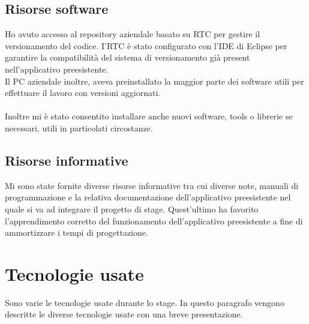 \subsection{Risorse software}
Ho avuto accesso al repository aziendale basato su RTC per gestire il versionamento del codice. I'RTC è stato configurato con l’IDE di Eclipse per garantire la compatibilità del sistema di versionamento già present nell'applicativo preesistente. \\
Il PC aziendale inoltre, aveva preinstallato la maggior parte dei software utili per effettuare il lavoro con versioni aggiornati. \\\\
Inoltre mi è stato consentito installare anche nuovi software, tools o librerie se necessari, utili in particolati circostanze.

\subsection{Risorse informative}
Mi sono state fornite diverse risorse informative tra cui diverse note, manuali di programmazione  e la relativa documentazione dell'applicativo preesistente nel quale si va ad integrare il progetto di stage. Quest'ultimo ha favorito l'apprendimento corretto del funzionamento dell'applicativo preesistente a fine di ammortizzare i tempi di progettazione. 


\section{Tecnologie usate}


Sono varie le tecnologie usate durante lo stage. In questo paragrafo vengono descritte le diverse tecnologie usate con una breve presentazione. \\\\

